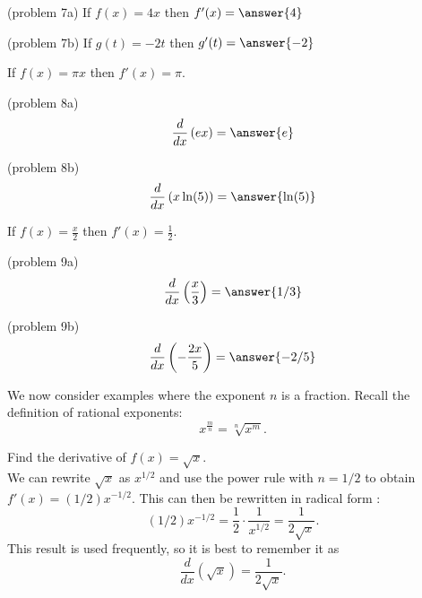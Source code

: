 \documentclass[handout]{ximera}
\begin{document}
\begin{problem}(problem 7a)
If $f(x) = 4x$ then $f'(x) = \answer{4}$
\end{problem}

\begin{problem}(problem 7b)
If $g(t) = -2t$ then $g'(t) = \answer{-2}$
\end{problem}



\begin{example}[example 8]
If $f(x) = \pi x$ then $f'(x) = \pi$.
\end{example}

\begin{problem}(problem 8a)
\[
\frac{d}{dx} \left(ex\right) = \answer{e}
\]
\end{problem}



\begin{problem}(problem 8b)
\[
\frac{d}{dx} \left(x\ln(5)\right) = \answer{\ln(5)}
\]
\end{problem}






\begin{example}[example 9]
If $f(x) = \frac{x}{2}$ then $f'(x) = \frac 12$.
\end{example}



\begin{problem}(problem 9a)
\[
\frac{d}{dx} \left(\frac{x}{3}\right) = \answer{1/3}
\]
\end{problem}



\begin{problem}(problem 9b)
\[
\frac{d}{dx} \left(-\frac{2x}{5}\right) = \answer{-2/5}
\]
\end{problem}






We now consider examples where the exponent $n$ is a fraction. Recall the definition of rational exponents:
\[
x^{\frac{m}{n}} = \sqrt[n]{x^m}.
\]



\begin{example}[example 10]
Find the derivative of $f(x) = \sqrt x$.\\
We can rewrite $\sqrt x$ as $x^{1/2}$ and use the power rule 
with $n = 1/2$ to obtain $f'(x) = (1/2)x^{-1/2}$.  This can then be rewritten in radical form :
\[(1/2)x^{-1/2} = \frac{1}{2}\cdot \frac{1}{x^{1/2}} = \frac{1}{2\sqrt x}.\]
This result is used frequently, so it is best to remember it as
\[\frac{d}{dx}\left(\sqrt x\right) = \frac{1}{2\sqrt x}.\]
\end{example}
\end{document}
